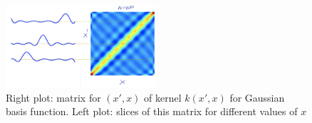 \begin{itemize}
\begin{itemize}
			\begin{figure}[ht]
			\centering
			\includegraphics[width=0.5\textwidth]{figures/bayesian_kernel_formulation.png}
			\caption{Right plot: matrix for $(x',x)$ of kernel $k\left(x',x\right)$ for Gaussian basis function. Left plot: slices of this matrix for different values of $x$}
		\end{figure}
		
	\end{itemize}
\end{itemize}
